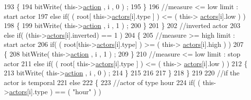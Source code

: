 \begin{DoxyCode}
193                         \{   
194                             bitWrite( this->\hyperlink{classJetpack_aca3142925a7b0834b34ae91d26af7765}{action} , i , 0 ) ;    
195                         \}
196                         \textcolor{comment}{//measure <= low limit : start actor}
197                         \textcolor{keywordflow}{else} \textcolor{keywordflow}{if}( ( root[ this->\hyperlink{classJetpack_a7e16d2f97837f9712a2e6de1c50d99db}{actors}[i].type ] ) <= ( this->
      \hyperlink{classJetpack_a7e16d2f97837f9712a2e6de1c50d99db}{actors}[i].low ) )
198                         \{
199                             bitWrite( this->\hyperlink{classJetpack_aca3142925a7b0834b34ae91d26af7765}{action} , i , 1 ) ;                    
200                         \}
201                     \}
202                     \textcolor{comment}{//inverted actor}
203                     \textcolor{keywordflow}{else} \textcolor{keywordflow}{if}( (this->\hyperlink{classJetpack_a7e16d2f97837f9712a2e6de1c50d99db}{actors}[i].inverted) == 1 )
204                     \{
205                         \textcolor{comment}{//measure >= high limit : start actor}
206                         \textcolor{keywordflow}{if}( ( root[this->\hyperlink{classJetpack_a7e16d2f97837f9712a2e6de1c50d99db}{actors}[i].type] ) >= ( this->
      \hyperlink{classJetpack_a7e16d2f97837f9712a2e6de1c50d99db}{actors}[i].high ) )    
207                         \{   
208                             bitWrite( this->\hyperlink{classJetpack_aca3142925a7b0834b34ae91d26af7765}{action} , i , 1 ) ;    
209                         \}
210                         \textcolor{comment}{//measure <= low limit : stop actor}
211                         \textcolor{keywordflow}{else} \textcolor{keywordflow}{if}( ( root[ this->\hyperlink{classJetpack_a7e16d2f97837f9712a2e6de1c50d99db}{actors}[i].type ] ) <= ( this->
      \hyperlink{classJetpack_a7e16d2f97837f9712a2e6de1c50d99db}{actors}[i].low ) )
212                         \{
213                             bitWrite( this->\hyperlink{classJetpack_aca3142925a7b0834b34ae91d26af7765}{action} , i , 0 ) ;                    
214                         \}
215 
216                     
217                     \}
218                 \}
219 
220                 \textcolor{comment}{//if the actor is temporal}
221                 \textcolor{keywordflow}{else}
222                 \{
223                     \textcolor{comment}{//actor of type hour}
224                     \textcolor{keywordflow}{if}( ( this->\hyperlink{classJetpack_a7e16d2f97837f9712a2e6de1c50d99db}{actors}[i].type ) == ( \textcolor{stringliteral}{"hour"} ) )  

\end{DoxyCode}
